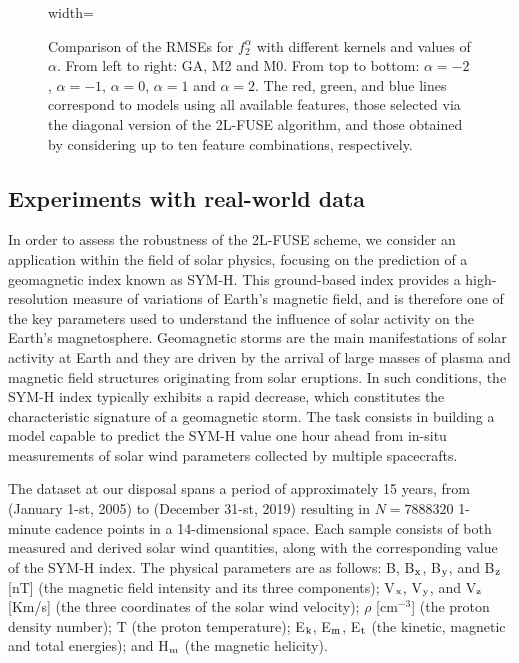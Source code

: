 \documentclass[hyphens,a4paper,11pt]{article}
\begin{document}
\begin{figure}[htbp]
\begin{adjustbox}{width=\textwidth}
\end{adjustbox}
\caption{Comparison of the RMSEs for $f_2^\alpha$ with different kernels and values of \(\alpha\). From left to right: GA, M2 and M0. From top to bottom: $\alpha = -2$, $\alpha = -1$, $\alpha = 0$, $\alpha = 1$ and $\alpha = 2$. The red, green, and blue lines correspond to models using all available features, those selected via the diagonal version of the 2L-FUSE algorithm, and those obtained by considering up to ten feature combinations, respectively.}
\label{fig:5}
\end{figure}

\subsection{Experiments with real-world data}

In order to assess the robustness of the 2L-FUSE scheme, we consider an application within the field of solar physics, focusing on the prediction of a geomagnetic index known as SYM-H. This ground-based index provides a high-resolution measure of variations of Earth's magnetic field, and is therefore one of the key parameters used to understand the influence of solar activity on the Earth's magnetosphere. Geomagnetic storms are the main manifestations of solar activity at Earth and they are driven by the arrival of large masses of plasma and magnetic field structures originating from solar eruptions. In such conditions, the SYM-H index typically exhibits a rapid decrease, which constitutes the characteristic signature of a geomagnetic storm. The task consists in building a model capable to predict the SYM-H value one hour ahead from in-situ measurements of solar wind parameters collected by multiple spacecrafts.

The dataset at our disposal spans a period of approximately 15 years, from (January 1-st, 2005) to (December 31-st, 2019) resulting in \(N = 7888320\) 1-minute cadence points in a 14-dimensional space. Each sample consists of both measured and derived solar wind quantities, along with the corresponding value of the SYM-H index. The physical parameters are as follows: B,  B$_{\rm{x}}$, B$_{\rm{y}}$, and B$_{\rm{z}}$ [nT] (the magnetic field intensity and its three components); V$_{\rm{x}}$, V$_{\rm{y}}$, and V$_{\rm{z}}$ [Km/s] (the three coordinates of the solar wind velocity); $\rho$ [cm$^{-3}$] (the proton density number); T (the proton temperature); E$_{\rm{k}}$, E$_{\rm{m}}$, E$_{\rm{t}}$ (the kinetic, magnetic and total energies); and H$_{\rm{m}}$ (the magnetic helicity).
\end{document}
